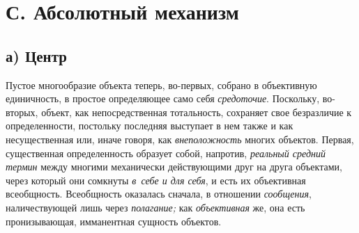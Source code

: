 \section[С. Абсолютный механизм]{С. Абсолютный механизм}
\subsection[а) Центр]{а) Центр}
Пустое многообразие объекта теперь, во-первых, собрано в
объективную единичность, в простое определяющее само себя
{\em средоточие}.
Поскольку, во-вторых, объект, как непосредственная
тотальность, сохраняет свое безразличие к определенности, постольку
последняя выступает в нем также и как несущественная или, иначе говоря, как
{\em внеположность}
многих объектов. Первая, существенная определенность образует
собой, напротив, {\em реальный средний
термин} между многими механически действующими друг на друга
объектами, через который они сомкнуты
{\em в~себе и для себя},
и есть их объективная всеобщность. Всеобщность оказалась
сначала, в отношении {\em сообщения},
наличествующей лишь через
{\em полагание;} как
{\em объективная} же, она
есть пронизывающая, имманентная сущность объектов.

